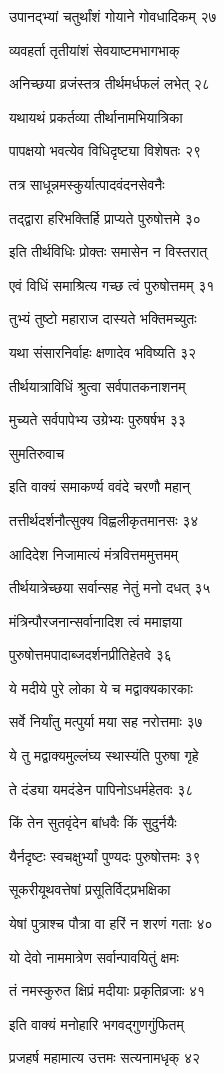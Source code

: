 उपानद्भ्यां चतुर्थांशं गोयाने गोवधादिकम् २७

व्यवहर्ता तृतीयांशं सेवयाष्टमभागभाक्

अनिच्छया व्रजंस्तत्र तीर्थमर्धफलं लभेत् २८

यथायथं प्रकर्तव्या तीर्थानामभियात्रिका

पापक्षयो भवत्येव विधिदृष्ट्या विशेषतः २९

तत्र साधून्नमस्कुर्यात्पादवंदनसेवनैः

तद्द्वारा हरिभक्तिर्हि प्राप्यते पुरुषोत्तमे ३०

इति तीर्थविधिः प्रोक्तः समासेन न विस्तरात्

एवं विधिं समाश्रित्य गच्छ त्वं पुरुषोत्तमम् ३१

तुभ्यं तुष्टो महाराज दास्यते भक्तिमच्युतः

यथा संसारनिर्वाहः क्षणादेव भविष्यति ३२

तीर्थयात्राविधिं श्रुत्वा सर्वपातकनाशनम्

मुच्यते सर्वपापेभ्य उग्रेभ्यः पुरुषर्षभ ३३

सुमतिरुवाच

इति वाक्यं समाकर्ण्य ववंदे चरणौ महान्

तत्तीर्थदर्शनौत्सुक्य विह्वलीकृतमानसः ३४

आदिदेश निजामात्यं मंत्रवित्तममुत्तमम्

तीर्थयात्रेच्छया सर्वान्सह नेतुं मनो दधत् ३५

मंत्रिन्पौरजनान्सर्वानादिश त्वं ममाज्ञया

पुरुषोत्तमपादाब्जदर्शनप्रीतिहेतवे ३६

ये मदीये पुरे लोका ये च मद्वाक्यकारकाः

सर्वे निर्यांतु मत्पुर्या मया सह नरोत्तमाः ३७

ये तु मद्वाक्यमुल्लंघ्य स्थास्यंति पुरुषा गृहे

ते दंड्या यमदंडेन पापिनोऽधर्महेतवः ३८

किं तेन सुतवृंदेन बांधवैः किं सुदुर्नयैः

यैर्नदृष्टः स्वचक्षुर्भ्यां पुण्यदः पुरुषोत्तमः ३९

सूकरीयूथवत्तेषां प्रसूतिर्विट्प्रभक्षिका

येषां पुत्राश्च पौत्रा वा हरिं न शरणं गताः ४०

यो देवो नाममात्रेण सर्वान्पावयितुं क्षमः

तं नमस्कुरुत क्षिप्रं मदीयाः प्रकृतिव्रजाः ४१

इति वाक्यं मनोहारि भगवद्गुणगुंफितम्

प्रजहर्ष महामात्य उत्तमः सत्यनामधृक् ४२

